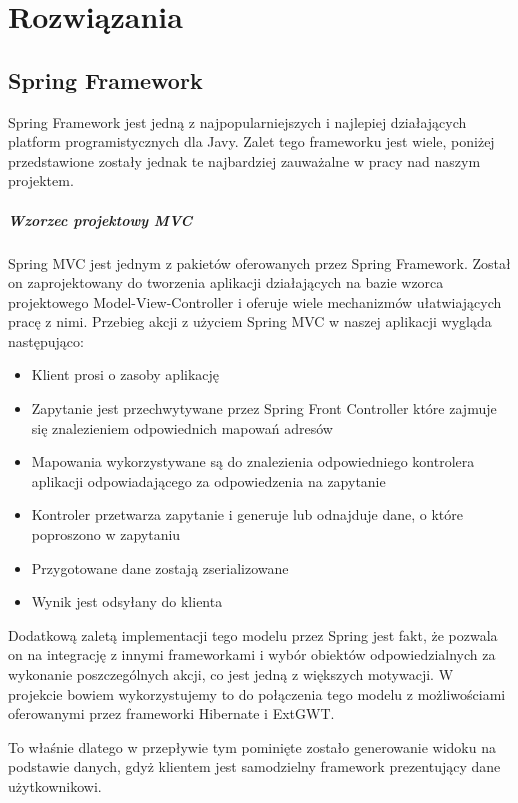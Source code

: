 \documentclass[licencjacka]{pracamgr}
\begin{document}
\chapter{Rozwiązania}
\section{Spring Framework}
Spring Framework jest jedną z najpopularniejszych i najlepiej działających platform programistycznych dla Javy. Zalet tego frameworku jest wiele, poniżej przedstawione zostały jednak te najbardziej zauważalne w pracy nad naszym projektem.

\paragraph{Wzorzec projektowy MVC}
Spring MVC jest jednym z pakietów oferowanych przez Spring Framework. Został on zaprojektowany do tworzenia aplikacji działających na bazie wzorca projektowego Model-View-Controller i oferuje wiele mechanizmów ułatwiających pracę z nimi. Przebieg akcji z użyciem Spring MVC w naszej aplikacji wygląda następująco:

\begin{itemize}
  \item Klient prosi o zasoby aplikację
  \item Zapytanie jest przechwytywane przez Spring Front Controller które zajmuje się znalezieniem odpowiednich mapowań adresów
  \item Mapowania wykorzystywane są do znalezienia odpowiedniego kontrolera aplikacji odpowiadającego za odpowiedzenia na zapytanie
  \item Kontroler przetwarza zapytanie i generuje lub odnajduje dane, o które poproszono w zapytaniu
  \item Przygotowane dane zostają zserializowane
  \item Wynik jest odsyłany do klienta
\end{itemize}

Dodatkową zaletą implementacji tego modelu przez Spring jest fakt, że pozwala on na integrację z innymi frameworkami i wybór obiektów odpowiedzialnych za wykonanie poszczególnych akcji, co jest jedną z większych motywacji. W projekcie bowiem wykorzystujemy to do połączenia tego modelu z możliwościami oferowanymi przez frameworki Hibernate i ExtGWT.

To właśnie dlatego w przepływie tym pominięte zostało generowanie widoku na podstawie danych, gdyż klientem jest samodzielny framework prezentujący dane użytkownikowi.
\end{document}
